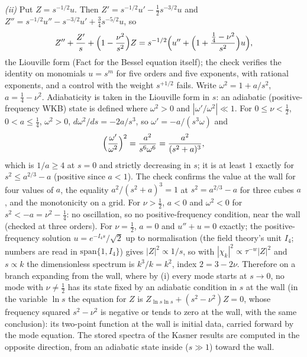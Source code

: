 \emph{(ii)} Put $Z = s^{-1/2}u$. Then $Z' = s^{-1/2}u' - \tfrac12 s^{-3/2}u$ and $Z'' = s^{-1/2}u'' - s^{-3/2}u' + \tfrac34 s^{-5/2}u$, so
\[
Z'' + \frac{Z'}{s} + \Bigl(1 - \frac{\nu^{2}}{s^{2}}\Bigr)Z = s^{-1/2}\Bigl(u'' + \Bigl(1 + \frac{\tfrac14 - \nu^{2}}{s^{2}}\Bigr)u\Bigr),
\]
the Liouville form (Fact  for the Bessel equation itself); the check verifies the identity on monomials $u = s^{m}$ for five orders and five exponents, with rational exponents, and a control with the weight $s^{+1/2}$ fails. Write $\omega^{2} = 1 + a/s^{2}$, $a = \tfrac14 - \nu^{2}$. Adiabaticity is taken in the Liouville form in $s$: an adiabatic (positive-frequency WKB) state is defined where $\omega^{2} > 0$ and $|\omega'/\omega^{2}| \ll 1$. For $0 \le \nu < \tfrac12$, $0 < a \le \tfrac14$, $\omega^{2} > 0$, $d\omega^{2}/ds = -2a/s^{3}$, so $\omega' = -a/(s^{3}\omega)$ and
\[
\Bigl(\frac{\omega'}{\omega^{2}}\Bigr)^{2} = \frac{a^{2}}{s^{6}\omega^{6}} = \frac{a^{2}}{(s^{2} + a)^{3}} ,
\]
which is $1/a \ge 4$ at $s = 0$ and strictly decreasing in $s$; it is at least $1$ exactly for $s^{2} \le a^{2/3} - a$ (positive since $a < 1$). The check confirms the value at the wall for four values of $a$, the equality $a^{2}/(s^{2} + a)^{3} = 1$ at $s^{2} = a^{2/3} - a$ for three cubes $a$, and the monotonicity on a grid. For $\nu > \tfrac12$, $a < 0$ and $\omega^{2} < 0$ for $s^{2} < -a = \nu^{2} - \tfrac14$: no oscillation, so no positive-frequency condition, near the wall (checked at three orders). For $\nu = \tfrac12$, $a = 0$ and $u'' + u = 0$ exactly; the positive-frequency solution $u = e^{-I_4 s}/\sqrt{2}$ up to normalisation (the field theory's unit $I_4$; numbers are read in $\mathrm{span}\{1, I_4\}$) gives $|Z|^{2} \propto 1/s$, so with $|\chi_{k}|^{2} \propto \tau^{-w}|Z|^{2}$ and $s \propto k$ the dimensionless spectrum is $k^{3}/k = k^{2}$, index $2 = 3 - 2\nu$. Therefore on a branch expanding from the wall, where by (i) every mode starts at $s \to 0$, no mode with $\nu \ne \tfrac12$ has its state fixed by an adiabatic condition in $s$ at the wall (in the variable $\ln s$ the equation for $Z$ is $Z_{\ln s \ln s} + (s^{2} - \nu^{2})Z = 0$, whose frequency squared $s^{2} - \nu^{2}$ is negative or tends to zero at the wall, with the same conclusion): its two-point function at the wall is initial data, carried forward by the mode equation. The stored spectra of the Kasner results are computed in the opposite direction, from an adiabatic state inside ($s \gg 1$) toward the wall.

